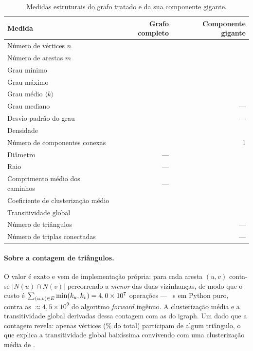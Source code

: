 \documentclass[sigconf]{webmedia}
\begin{document}
\begin{table}[t]
\centering
\caption{Medidas estruturais do grafo tratado e da sua componente gigante.}
\label{tab:estrutura}
\small
\begin{tabular}{lrr}
\hline
\textbf{Medida} & \textbf{Grafo completo} & \textbf{Componente gigante} \\ \hline
Número de vértices $n$            & \numVertices{} & \tamCG{} \\
Número de arestas $m$             & \numArestas{}  & \arestasCG{} \\
Grau mínimo                       & \grauMin{}     & \grauMin{} \\
Grau máximo                       & \grauMax{}     & \grauMax{} \\
Grau médio $\langle k\rangle$     & \grauMedio{}   & \grauMedioCG{} \\
Grau mediano                      & \grauMediano{} & --- \\
Desvio padrão do grau             & \grauDesvio{}  & --- \\
Densidade                         & \densidade{}   & \densidadeCG{} \\
Número de componentes conexas     & \numComponentes{} & 1 \\
Diâmetro                          & ---            & \diametro{} \\
Raio                              & ---            & \raio{} \\
Comprimento médio dos caminhos    & ---            & \caminhoMedio{} \\
Coeficiente de clusterização médio& \clusterMedia{} & \clusterMediaCG{} \\
Transitividade global             & \transitividade{} & \transitividadeCG{} \\
Número de triângulos              & \numTriangulos{} & --- \\
Número de triplas conectadas      & \numTriplas{}     & --- \\
\hline
\end{tabular}
\end{table}

\paragraph{Sobre a contagem de triângulos.} O valor \numTriangulos{} é
exato e vem de implementação própria: para cada aresta $(u,v)$ conta-se
$|N(u)\cap N(v)|$ percorrendo a \emph{menor} das duas vizinhanças, de
modo que o custo é $\sum_{(u,v)\in E}\min(k_u,k_v) = 4,0 \times 10^{7}{}$
operações --- \triTempo{}~s em Python puro, contra as $\approx4{,}5
\times10^{9}$ do algoritmo \textit{forward} ingênuo. A clusterização
média e a transitividade global derivadas dessa contagem
\triConfere{} com as do igraph. Um dado que a contagem revela:
apenas \triVertices{} vértices (\triFracVertices{}\% do total)
participam de algum triângulo, o que explica a transitividade global
baixíssima convivendo com uma clusterização média de \clusterMedia{}.
\end{document}

